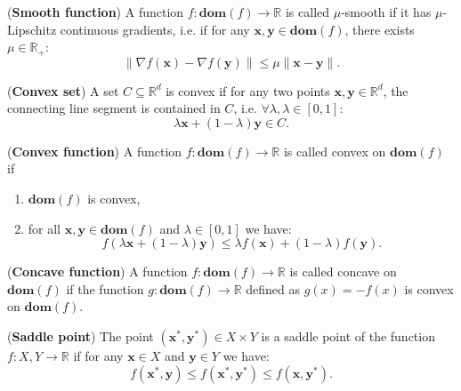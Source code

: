 \begin{definition}
    (\textbf{Smooth function}) A function $f : \textbf{dom}(f) \rightarrow \mathbb{R}$ is called $\mu$-smooth if it has $\mu$-Lipschitz continuous gradients, i.e. if for any $\bm{x},\bm{y} \in \textbf{dom}(f)$, there exists $\mu \in \mathbb{R}_+$:
    \[
      \|\nabla f(\bm{x}) -\nabla f(\bm{y})\| \leq \mu \| \bm{x} - \bm{y} \|.
    \]
\end{definition}

\begin{definition}
    (\textbf{Convex set}) A set $C \subseteq \mathbb{R}^d$ is convex if for any two points $\bm{x},\bm{y} \in \mathbb{R}^d$, the connecting line segment is contained in $C$, i.e. $\forall \lambda, \lambda \in [0,1]$:
    \[  \lambda \bm{x} + (1-\lambda) \bm{y} \in C.\]
\end{definition}

\begin{definition}
    (\textbf{Convex function}) A function $f : \textbf{dom}(f) \rightarrow \mathbb{R}$ is called convex on $\textbf{dom}(f)$ if 
    \begin{enumerate}
        \item $\textbf{dom}(f)$ is convex,
        \item for all $\bm{x}, \bm{y} \in  \textbf{dom}(f)$ and $\lambda \in [0,1]$ we have:
        \[  f(\lambda \bm{x} + (1-\lambda) \bm{y}) \leq \lambda f(\bm{x}) + (1-\lambda) f(\bm{y}). \]
    \end{enumerate}
\end{definition}

\begin{definition}
    (\textbf{Concave function}) A function $f : \textbf{dom}(f) \rightarrow \mathbb{R}$ is called concave on $\textbf{dom}(f)$ if the function $g : \textbf{dom}(f) \rightarrow \mathbb{R}$ defined as $g(x)= -f(x)$ is convex on $\textbf{dom}(f)$.
\end{definition}

\begin{definition}
    \label{def:saddle_point}
    (\textbf{Saddle point}) The point $(\bm{x}^*,\bm{y}^*)\in X \times Y$  is a saddle point of the function $f:X,Y \rightarrow \mathbb{R}$ if for any $\bm{x} \in X$ and $\bm{y} \in Y$ we have:
     \[ f(\bm{x}^*,\bm{y}) \leq f(\bm{x}^*,\bm{y}^*) \leq f(\bm{x},\bm{y}^*). \]
\end{definition}

